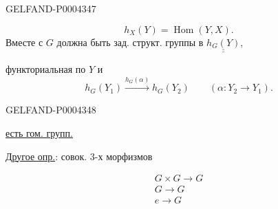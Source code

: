 \begin{GelfandAdjacentEvidence}{GELFAND-P000434}{7}

\begingroup\color{black}\begin{equation*}
h_X(Y)=\operatorname{Hom}(Y,X).
\end{equation*}\endgroup
Вместе с $G$ должна быть зад. структ. группы в $\underline{\underline{h_G(Y)}}$,


функториальная по $Y$ и
\begingroup\color{black}\begin{equation*}
h_G(Y_1)\overset{h_G(\alpha)}{\longrightarrow}h_G(Y_2)
\qquad (\alpha:Y_2\longrightarrow Y_1).
\end{equation*}\endgroup
{}
\end{GelfandAdjacentEvidence}
\begin{GelfandAdjacentEvidence}{GELFAND-P000434}{8}

\underline{есть гом. групп.}



\underline{Другое опр.}: совок. 3-х морфизмов


\begingroup\color{black}\begin{gather*}
G\times G\longrightarrow G\\
G\longrightarrow G\\
e\longrightarrow G
\end{gather*}\endgroup
{}
\end{GelfandAdjacentEvidence}
